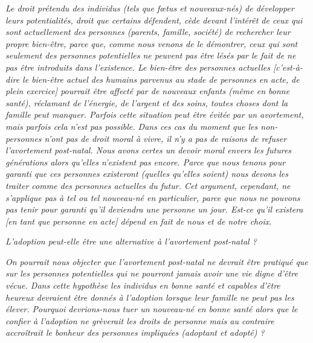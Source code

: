 \begin{displayquote}

\emph{Le droit prétendu des individus (tels que fœtus et nouveaux-nés) de développer leurs potentialités, droit que certains défendent, cède devant l'intérêt de ceux qui sont actuellement des personnes (parents, famille, société) de rechercher leur propre bien-être, parce que, comme nous venons de le démontrer, ceux qui sont seulement des personnes potentielles ne peuvent pas être lésés par le fait de ne pas être introduits dans l'existence. Le bien-être des personnes actuelles \emph{[c'est-à-dire le bien-être actuel des humains parvenus au stade de personnes en acte, de plein exercice]} pourrait être affecté par de nouveaux enfants (même en bonne santé), réclamant de l'énergie, de l'argent et des soins, toutes choses dont la famille peut manquer. Parfois cette situation peut être évitée par un avortement, mais parfois cela n'est pas possible. Dans ces cas du moment que les non-personnes n'ont pas de droit moral à vivre, il n'y a pas de raisons de refuser l'avortement post-natal. Nous avons certes un devoir moral envers les futures générations alors qu'elles n'existent pas encore. Parce que nous tenons pour garanti que ces personnes existeront (quelles qu'elles soient) nous devons les traiter comme des personnes actuelles du futur. Cet argument, cependant, ne s'applique pas à tel ou tel nouveau-né en particulier, parce que nous ne pouvons pas tenir pour garanti qu'il deviendra une personne un jour. Est-ce qu'il existera \emph{[en tant que personne en acte]} dépend en fait de nous et de notre choix}.

\emph{L'adoption peut-elle être une alternative à l'avortement post-natal ?}

\emph{On pourrait nous objecter que l'avortement post-natal ne devrait être pratiqué que sur les personnes potentielles qui ne pourront jamais avoir une vie digne d'être vécue. Dans cette hypothèse les individus en bonne santé et capables d'être heureux devraient être donnés à l'adoption lorsque leur famille ne peut pas les élever. Pourquoi devrions-nous tuer un nouveau-né en bonne santé alors que le confier à l'adoption ne grèverait les droits de personne mais au contraire accroîtrait le bonheur des personnes impliquées (adoptant et adopté) ?}


\end{displayquote}
